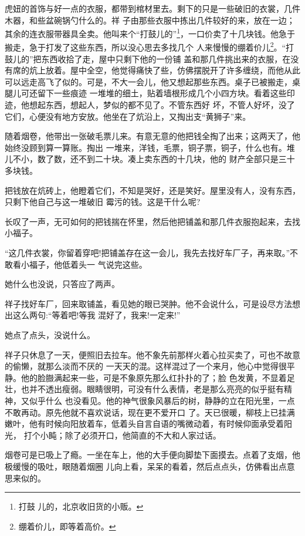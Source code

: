 \documentclass[11pt,a4paper,onecolumn]{article}
\begin{document}
虎妞的首饰与好一点的衣服，都带到棺材里去。剩下的只是一些破旧的衣裳，几件木器，和些盆碗锅勺什么的。祥
子由那些衣服中拣出几件较好的来，放在一边；其余的连衣服带器具全卖。他叫来个``打鼓儿的''\footnote{打鼓
  儿的，北京收旧货的小贩。}，一口价卖了十几块钱。他急于搬走，急于打发了这些东西，所以没心思去多找几个
人来慢慢的绷着价儿\footnote{绷着价儿，即等着高价。}。``打鼓儿的''把东西收拾了走，屋中只剩下他的一份铺
盖和那几件挑出来的衣服，在没有席的炕上放着。屋中全空，他觉得痛快了些，仿佛摆脱开了许多缠绕，而他从此
可以远走高飞了似的。可是，不大一会儿，他又想起那些东西。桌子已被搬走，桌腿儿可还留下一些痕迹\myrule
一堆堆的细土，贴着墙根形成几个小四方块。看着这些印迹，他想起东西，想起人，梦似的都不见了。不管东西好
坏，不管人好坏，没了它们，心便没有地方安放。他坐在了炕沿上，又掏出支``黄狮子''来。

随着烟卷，他带出一张破毛票儿来。有意无意的他把钱全掏了出来；这两天了，他始终没顾到算一算账。掏出
一堆来，洋钱，毛票，铜子票，铜子，什么也有。堆儿不小，数了数，还不到二十块。凑上卖东西的十几块，他的
财产全部只是三十多块钱。

把钱放在炕砖上，他瞪着它们，不知是哭好，还是笑好。屋里没有人，没有东西，只剩下他自己与这一堆破旧
霉污的钱。这是干什么呢?

长叹了一声，无可如何的把钱揣在怀里，然后他把铺盖和那几件衣服抱起来，去找小福子。

``这几件衣裳，你留着穿吧!把铺盖存在这一会儿，我先去找好车厂子，再来取。''不敢看小福子，他低着头一
气说完这些。

她什么也没说，只答应了两声。

祥子找好车厂，回来取铺盖，看见她的眼已哭肿。他不会说什么，可是设尽方法想出这么两句:``等着吧!等我
混好了，我来!一定来!''

她点了点头，没说什么。

祥子只休息了一天，便照旧去拉车。他不象先前那样火着心拉买卖了，可也不故意的偷懒，就那么淡而不厌的
一天天的混。这样混过了一个来月，他心中觉得很平静。他的脸臌满起来一些，可是不象原先那么红扑扑的了；脸
色发黄，不显着足壮，也并不透出瘦弱。眼睛很明，可没有什么表情，老是那么亮亮的似乎挺有精神，又似乎什么
也没看见。他的神气很象风暴后的树，静静的立在阳光里，一点不敢再动。原先他就不喜欢说话，现在更不爱开口
了。天已很暖，柳枝上已挂满嫩叶，他有时候向阳放着车，低着头自言自语的嘴微动着，有时候仰面承受着阳光，
打个小盹；除了必须开口，他简直的不大和人家过话。

烟卷可是已吸上了瘾。一坐在车上，他的大手便向脚垫下面摸去。点着了支烟，他极缓慢的吸吐，眼随着烟圈
儿向上看，呆呆的看着，然后点点头，仿佛看出点意思来似的。
\end{document}

